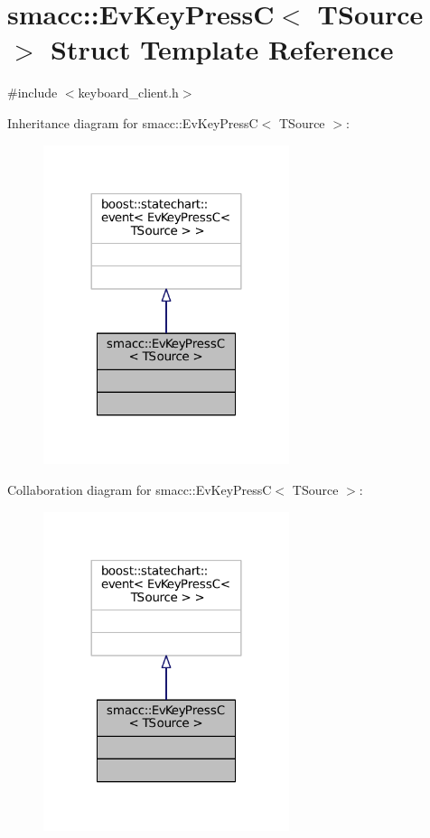 \hypertarget{structsmacc_1_1EvKeyPressC}{}\section{smacc\+:\+:Ev\+Key\+PressC$<$ T\+Source $>$ Struct Template Reference}
\label{structsmacc_1_1EvKeyPressC}


{\ttfamily \#include $<$keyboard\+\_\+client.\+h$>$}



Inheritance diagram for smacc\+:\+:Ev\+Key\+PressC$<$ T\+Source $>$\+:
\nopagebreak
\begin{figure}[H]
\begin{center}
\leavevmode
\includegraphics[width=204pt]{structsmacc_1_1EvKeyPressC__inherit__graph}
\end{center}
\end{figure}


Collaboration diagram for smacc\+:\+:Ev\+Key\+PressC$<$ T\+Source $>$\+:
\nopagebreak
\begin{figure}[H]
\begin{center}
\leavevmode
\includegraphics[width=204pt]{structsmacc_1_1EvKeyPressC__coll__graph}
\end{center}
\end{figure}


